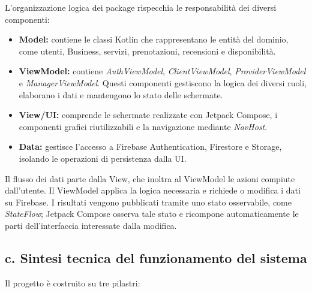 \documentclass[12pt]{article}
\begin{document}
L'organizzazione logica dei package rispecchia le responsabilità dei diversi componenti:
\begin{itemize}
    \item \textbf{Model:} contiene le classi Kotlin che rappresentano le entità del dominio, come utenti, Business, servizi, prenotazioni, recensioni e disponibilità.
    \item \textbf{ViewModel:} contiene \textit{AuthViewModel}, \textit{ClientViewModel}, \textit{ProviderViewModel} e \textit{ManagerViewModel}. Questi componenti gestiscono la logica dei diversi ruoli, elaborano i dati e mantengono lo stato delle schermate.
    \item \textbf{View/UI:} comprende le schermate realizzate con Jetpack Compose, i componenti grafici riutilizzabili e la navigazione mediante \textit{NavHost}.
    \item \textbf{Data:} gestisce l'accesso a Firebase Authentication, Firestore e Storage, isolando le operazioni di persistenza dalla UI.
\end{itemize}

Il flusso dei dati parte dalla View, che inoltra al ViewModel le azioni compiute dall'utente. Il ViewModel applica la logica necessaria e richiede o modifica i dati su Firebase. I risultati vengono pubblicati tramite uno stato osservabile, come \textit{StateFlow}; Jetpack Compose osserva tale stato e ricompone automaticamente le parti dell'interfaccia interessate dalla modifica.

\subsection{c. Sintesi tecnica del funzionamento del sistema}
Il progetto è costruito su tre pilastri:
\end{document}
